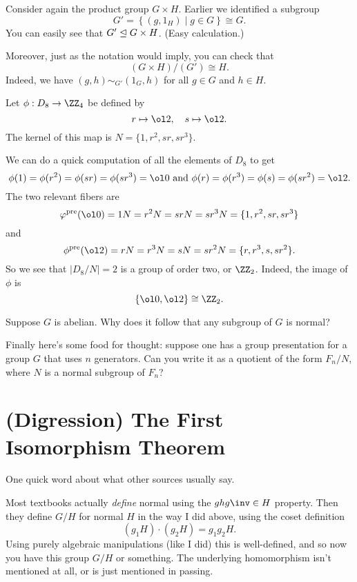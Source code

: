 \begin{example}
	Consider again the product group $G \times H$.
	Earlier we identified a subgroup
	\[ G' =  \left\{ (g, 1_H) \mid g \in G \right\} \cong G. \]
	You can easily see that $G' \trianglelefteq G \times H$.
	(Easy calculation.)

	Moreover, just as the notation would imply, you can check that
	\[ (G \times H) / (G') \cong H. \]
	Indeed, we have $(g, h) \sim_{G'} (1_G, h)$ for all $g \in G$ and $h \in H$.
\end{example}
\begin{example}
	Let $\phi: D_8 \to \Zc 4$ be defined by \[ r \mapsto \ol 2, \quad s \mapsto \ol 2. \] 
	The kernel of this map is $N = \{1,r^2,sr,sr^3\}$.

	We can do a quick computation of all the elements of $D_8$ to get
	\[ \phi(1) = \phi(r^2) = \phi(sr) = \phi(sr^3) = \ol 0 
	\text{ and }
	 \phi(r) = \phi(r^3) = \phi(s) = \phi(sr^2) = \ol 2. \]
	The two relevant fibers are \[ \varphi\pre(\ol 0) = 1N = r^2N = srN = sr^3N = \{1,r^2,sr,sr^3\} \] and 
	\[ \phi\pre(\ol 2) = rN = r^3N = sN = sr^2N = \{r,r^3,s,sr^2\}. \]
	So we see that $|D_8/N| = 2$ is a group of order two, or $\Zc 2$.
	Indeed, the image of $\phi$ is \[ \left\{ \ol 0, \ol 2 \right\} \cong \Zc 2. \]
\end{example}

\begin{ques}
	Suppose $G$ is abelian.
	Why does it follow that any subgroup of $G$ is normal?
\end{ques}

Finally here's some food for thought:
suppose one has a group presentation for a group $G$
that uses $n$ generators.
Can you write it as a quotient of the form $F_n / N$, where $N$ is a normal subgroup of $F_n$?


\section{(Digression) The First Isomorphism Theorem}
One quick word about what other sources usually say.

Most textbooks actually \emph{define} normal using the $ghg\inv \in H$ property.
Then they define $G/H$ for normal $H$ in the way I did above,
using the coset definition
\[ (g_1H) \cdot (g_2H) = g_1g_2H. \]
Using purely algebraic manipulations (like I did) this is well-defined,
and so now you have this group $G/H$ or something.
The underlying homomorphism isn't mentioned at all,
or is just mentioned in passing.

